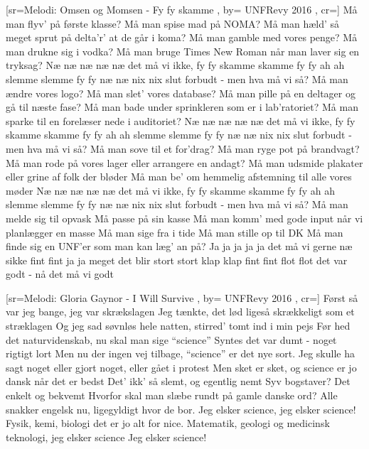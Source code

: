 \documentclass[pdftex,12pt]{article}
\begin{document}
\begin{songs}{}
[sr={Melodi: Omsen og Momsen - Fy fy skamme}
,
by={ UNFRevy 2016}
,
cr={}]\hypertarget{Hvad maa man}{}
\label{song90}
\beginverse
		Må man flyv’ på første klasse?
		Må man spise mad på NOMA?
		Må man hæld’ så meget sprut på delta’r’
		at de går i koma?
\endverse
\beginverse			
		Må man gamble med vores penge?
		Må man drukne sig i vodka?
		Må man bruge Times New Roman
		når man laver sig en tryksag?
\endverse
\beginverse			
		Næ næ næ næ næ det må vi ikke,
		fy fy skamme skamme fy fy ah ah
		slemme slemme fy fy næ næ nix nix
		slut forbudt - men hva må vi så?
\endverse
\beginverse			
		Må man ændre vores logo?
		Må man slet’ vores database?
		Må man pille på en deltager
		og gå til næste fase?
\endverse
\beginverse			
		Må man bade under sprinkleren
		som er i lab’ratoriet?
		Må man sparke til en forelæser
		nede i auditoriet?
\endverse
\beginverse			
		Næ næ næ næ næ det må vi ikke,
		fy fy skamme skamme fy fy ah ah
		slemme slemme fy fy næ næ nix nix
		slut forbudt - men hva må vi så?
\endverse
\beginverse			
		Må man sove til et for’drag?
		Må man ryge pot på brandvagt?
		Må man rode på vores lager
		eller arrangere en andagt?
\endverse
\beginverse			
		Må man udsmide plakater
		eller grine af folk der bløder
		Må man be’ om hemmelig afstemning
		til alle vores møder
\endverse
\beginverse	
		Næ næ næ næ næ det må vi ikke,
		fy fy skamme skamme fy fy ah ah
		slemme slemme fy fy næ næ nix nix
		slut forbudt - men hva må vi så?
\endverse
\beginverse			
		Må man melde sig til opvask
		Må passe på sin kasse
		Må man komm’ med gode input
		når vi planlægger en masse
\endverse
\beginverse			
		Må man sige fra i tide
		Må man stille op til DK
		Må man finde sig en UNF’er
		som man kan læg’ an på?
\endverse
\beginverse			
		Ja ja ja ja ja det må vi gerne
		næ sikke fint fint ja ja meget det blir
		stort stort klap klap fint fint flot flot
		det var godt - nå det må vi godt
\endverse
\endsong


[sr={Melodi: Gloria Gaynor - I Will Survive}
,
by={ UNFRevy 2016}
,
cr={}]\hypertarget{Jeg elsker science}{}
\label{song91}
\beginverse
Først så var jeg bange, jeg var skrækslagen
Jeg tænkte, det lød ligeså skrækkeligt som et stræklagen
Og jeg sad søvnløs hele natten, stirred’ tomt ind i min pejs
Før hed det naturvidenskab, nu skal man sige “science”
\endverse
\beginverse
Syntes det var dumt - noget rigtigt lort
Men nu der ingen vej tilbage, “science” er det nye sort.
Jeg skulle ha sagt noget eller gjort noget, eller gået i protest
Men sket er sket, og science er jo dansk når det er bedst
\endverse
\beginverse
Det’ ikk’ så slemt, og egentlig nemt
Syv bogstaver? Det enkelt og bekvemt
Hvorfor skal man slæbe rundt på gamle danske ord?
Alle snakker engelsk nu, ligegyldigt hvor de bor.
\endverse
\beginverse
Jeg elsker science, jeg elsker science!
Fysik, kemi, biologi
det er jo alt for nice.
Matematik, geologi
og medicinsk teknologi, jeg elsker science
Jeg elsker science!
\endverse
\endsong



\end{songs}
\end{document}
